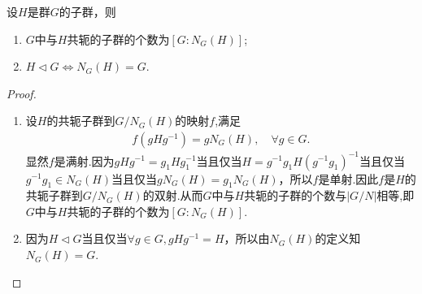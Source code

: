 \documentclass[../../main.tex]{subfiles}%
\begin{document}
\begin{theorem}\label{theorem:共轭子群的个数和正规化子的性质}
设$H$是群$G$的子群，则
\begin{enumerate}[(1)]
\item\label{theorem:共轭子群的个数和正规化子的性质-1} $G$中与$H$共轭的子群的个数为$[G : N_G(H)]$;

\item\label{theorem:共轭子群的个数和正规化子的性质-2} $H \lhd G\iff N_G(H) = G$.
\end{enumerate}
\end{theorem}
\begin{proof}
\begin{enumerate}[(1)]
\item 设$H$的共轭子群到$G/N_G(H)$的映射$f$,满足
\begin{align*}
f(gHg^{-1}) = gN_G(H),\quad \forall g\in G.
\end{align*}
显然$f$是满射.因为$gHg^{-1} = g_1Hg_1^{-1}$当且仅当$H=g^{-1}g_1H(g^{-1}g_1)^{-1}$当且仅当$g^{-1}g_1 \in N_G(H)$当且仅当$gN_G(H)=g_1N_G(H)$，所以$f$是单射.因此$f$是$H$的共轭子群到$G/N_G(H)$的双射.从而$G$中与$H$共轭的子群的个数与$|G/N|$相等,即$G$中与$H$共轭的子群的个数为$[G : N_G(H)]$.

\item 因为$H \lhd G$当且仅当$\forall g \in G, gHg^{-1} = H$，所以由$N_G(H)$的定义知$N_G(H) = G$.
\end{enumerate}
\end{proof}
\end{document}
